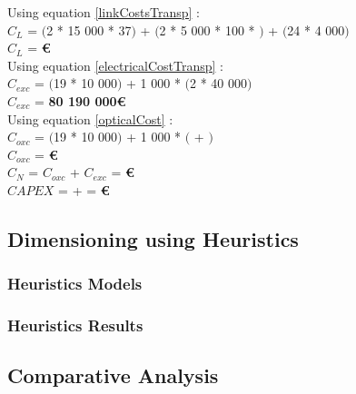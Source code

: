 Using equation \ref{linkCostsTransp} : \\
$C_L$ = $($2 * 15 000 * 37$)$ + $($2 * 5 000 * 100 * $)$ + $($24 * 4 000$)$ \\
$C_L$ = \textbf{ \euro} \\

Using equation \ref{electricalCostTransp} : \\
$C_{exc}$ = $($19 * 10 000$)$ + 1 000 * $($2 * 40 000$)$ \\
$C_{exc}$ = \textbf{80 190 000\euro} \\

Using equation \ref{opticalCost} : \\
$C_{oxc}$ = $($19 * 10 000$)$ + 1 000 * $($ + $)$ \\
$C_{oxc}$ = \textbf{ \euro} \\
$C_N$ = $C_{oxc}$ + $C_{exc}$ = \textbf{ \euro} \\

$CAPEX$ =  +  = \textbf{ \euro}\\

\newpage

\subsection{Dimensioning using Heuristics}

\subsubsection{Heuristics Models}

\subsubsection{Heuristics Results}

\subsection{Comparative Analysis} 